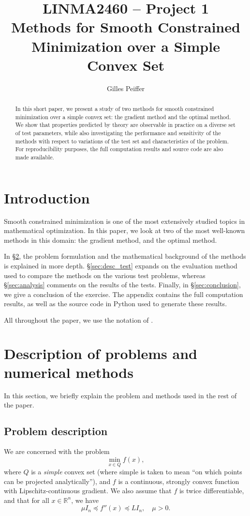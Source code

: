 \documentclass[final]{aomart}
\title[Methods for Smooth Constrained Minimization over a Simple Convex Set]{LINMA2460 -- Project 1\\
Methods for Smooth Constrained Minimization over a Simple Convex Set}
\author{Gilles Peiffer}
\newtheorem[{}\it]{thm}{Theorem}[section]
\theoremstyle{definition}
\newtheorem*[{}\it]{notation}{Notation}
\numberwithin{equation}{section}
\newcommand{\secref}[1]{\S\ref{#1}}
\begin{document}
\begin{abstract}
	In this short paper, we present a study of two methods for smooth constrained minimization over a simple convex set: the gradient method and the optimal method.
	We show that properties predicted by theory are observable in practice on a diverse set of test parameters, while also investigating the performance and sensitivity of the methods with respect to variations of the test set and characteristics of the problem.
	For reproducibility purposes, the full computation results and source code are also made available.
\end{abstract}

\maketitle
\tableofcontents
\newpage

\section{Introduction}
Smooth constrained minimization is one of the most extensively studied topics in mathematical optimization.
In this paper, we look at two of the most well-known methods in this domain: the gradient method, and the optimal method.

In \secref{sec:desc_pnm}, the problem formulation and the mathematical background of the methods is explained in more depth.
\secref{sec:desc_test} expands on the evaluation method used to compare the methods on the various test problems, whereas \secref{sec:analysis} comments on the results of the tests.
Finally, in \secref{sec:conclusion}, we give a conclusion of the exercise.
The appendix contains the full computation results, as well as the source code in Python used to generate these results.

All throughout the paper, we use the notation of \cite{Nesterov2018}.

\section{Description of problems and numerical methods}
\label{sec:desc_pnm}
In this section, we briefly explain the problem and methods used in the rest of the paper.

\subsection{Problem description}
\label{sec:prob}
We are concerned with the problem
\begin{equation}
\min_{x \in Q} f(x),
\end{equation}
where \(Q\) is a \emph{simple} convex set (where simple is taken to mean ``on which points can be projected analytically''), and \(f\) is a continuous, strongly convex function with Lipschitz-continuous gradient.
We also assume that \(f\) is twice differentiable, and that for all \(x \in \mathbb{R}^n\), we have
\begin{equation}
\mu I_n \preceq f''(x) \preceq L I_n, \quad \mu > 0.
\end{equation}
\end{document}
